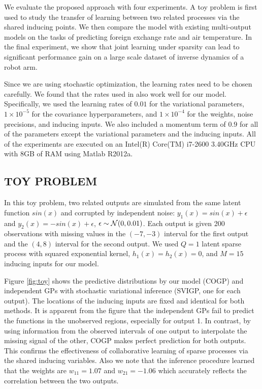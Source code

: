 We evaluate the proposed approach with four experiments.
A toy problem is first used to study the transfer of learning between two related processes via the shared inducing points.
We then compare the model with existing multi-output models on the tasks of predicting foreign exchange rate and air temperature.
In the final experiment, we show that joint learning under sparsity can lead to significant performance gain on a large scale dataset of inverse dynamics of a robot arm. 

Since we are using stochastic optimization, the learning rates need to be chosen carefully.
We found that the rates used in \cite{hensmangaussian} also work well for our model.
Specifically, we used the learning rates of $0.01$ for the variational parameters, $1 \times 10^{-5}$ for the  covariance hyperparameters, and $1 \times 10^{-4}$ for the weights, noise precisions, and inducing inputs.
We also included a momentum term of $0.9$ for all of the parameters except the variational parameters and the inducing inputs.
All of the experiments are executed on an Intel(R) Core(TM) i7-2600 3.40GHz CPU with 8GB of RAM using Matlab R2012a.
%
\subsection{TOY PROBLEM}
In this toy problem, two related outputs are simulated from the same latent function $sin(x)$ and corrupted by independent noise: $y_1(x) = sin(x) + \epsilon$ and $y_2(x) = -sin(x) + \epsilon$, $\epsilon \sim \mathcal{N}(0,0.01)$.
Each output is given 200 observations with missing values in the $(-7,-3)$ interval for the first output and the $(4,8)$ interval for the second output.
We used $Q = 1$ latent sparse process with squared exponential kernel, $h_1(x) = h_2(x) = 0$, and $M = 15$ inducing inputs for our model.

Figure \ref{fig:toy} shows the predictive distributions by our model (COGP) and independent GPs with stochastic variational inference (SVIGP, one for each output).
The locations of the inducing inputs are fixed and identical for both methods.
It is apparent from the figure that the independent GPs fail to predict the functions in the unobserved regions, especially for output 1.
In contrast, by using information from the observed intervals of one output to interpolate the missing signal of the other, COGP makes perfect prediction for both outputs.
This confirms the effectiveness of collaborative learning of sparse processes via the shared inducing variables. 
Also we note that the inference procedure learned that the weights are $w_{11} = 1.07$ and $w_{21} = -1.06$ which accurately reflects the correlation between the two outputs.

